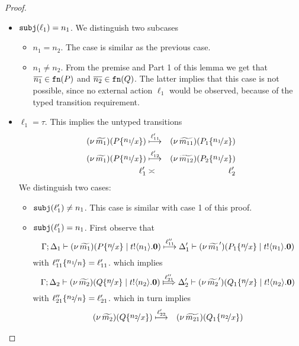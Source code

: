 \begin{proof}
\begin{enumerate}[1.]
\begin{itemize}
					\item	$\mathtt{subj}(\ell_1) = n_1$. We distinguish two subcases
							\begin{itemize}
								\item	$n_1 = n_2$. The case is similar as the previous case.
								\item	$n_1 \not= n_2$.
										From the premise and Part 1 of this lemma we get
										that $\overline{n_1} \in \mathtt{fn}(P)$ and $\overline{n_2} \in \mathtt{fn}(Q)$.
										The latter implies that this case is not possible, since
										no external action $\ell_1$ would be observed, because
										of the typed transition requirement.
							\end{itemize}

					\item	$\ell_1 = \tau$. This implies the untyped transitions
							\begin{eqnarray}
								\newsp{\widetilde{m_1}}{P \subst{n_1}{x}} &\hby{\ell_{11}'}& \newsp{\widetilde{m_{11}}}{P_1 \subst{n_1}{x}}
								\label{lem:tr_app_41}\\
								\newsp{\widetilde{m_1}}{P \subst{n_1}{x}} &\hby{\ell_{12}'}& \newsp{\widetilde{m_{12}}}{P_2 \subst{n_1}{x}}
								\label{lem:tr_app_42}\\
								\ell_1' &\asymp& \ell_2'
							\end{eqnarray}
							We distinguish two cases:
							\begin{itemize}
								\item	$\mathtt{subj}(\ell_1') \not= n_1$. This case is similar with case 1 of this proof.
								\item	$\mathtt{subj}(\ell_1') = n_1$.
										First observe that
										\[
											\horel{\Gamma}{\Delta_1}{\newsp{\widetilde{m_1}}{P \subst{n}{x} \Par \bout{t}{n_1} \inact}}
											{ \hby{\ell_{11}''} }
											{\Delta_1'}{\newsp{\widetilde{m_1}'}{P_1 \subst{n}{x} \Par \bout{t}{n_1} \inact}}
										\]
										with $\ell_{11}'' \subst{n_1}{n}  = \ell_{11}' $.
										which implies
										\[
											\horel{\Gamma}{\Delta_2}{\newsp{\widetilde{m_2}}{Q \subst{n}{x} \Par \bout{t}{n_2} \inact}}
											{ \Hby{\ell_{21}''} }
											{\Delta_2'}{\newsp{\widetilde{m_2}'}{Q_1 \subst{n}{x} \Par \bout{t}{n_2} \inact}}
										\]
										with $\ell_{21}'' \subst{n_2}{n}  = \ell_{21}' $.
										which in turn implies
										\begin{eqnarray}
											\newsp{\widetilde{m_2}}{Q \subst{n_2}{x}} &\hby{\ell_{22}'}& \newsp{\widetilde{m_{21}}}{Q_1 \subst{n_2}{x}}
											\label{lem:tr_app_43}

\end{eqnarray}
\end{itemize}
\end{itemize}
\end{enumerate}
\end{proof}
